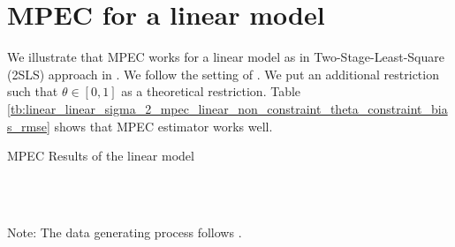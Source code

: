\documentclass[11pt, a4paper]{article}
\begin{document}
\newpage




\newpage
\appendix

\section{MPEC for a linear model}

We illustrate that MPEC works for a linear model as in Two-Stage-Least-Square (2SLS) approach in \cite{matsumura2023revisiting}. 
We follow the setting of \cite{matsumura2023revisiting}.
We put an additional restriction such that $\theta\in[0,1]$ as a theoretical restriction. Table \ref{tb:linear_linear_sigma_2_mpec_linear_non_constraint_theta_constraint_bias_rmse} shows that MPEC estimator works well.



\begin{table}[!htbp]
  \begin{center}
      \caption{MPEC Results of the linear model}
      \label{tb:linear_linear_sigma_2_mpec_linear_non_constraint_theta_constraint_bias_rmse} 
      \subfloat[$\sigma=0.001$]{}\\
      \subfloat[$\sigma=0.5$]{}\\
    \subfloat[$\sigma=2.0$]{}
  \end{center}
  \footnotesize
  Note: The data generating process follows \cite{matsumura2023revisiting}.
\end{table} 
\end{document}
